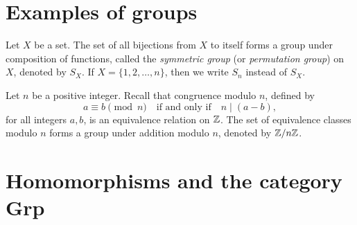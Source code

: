 \section{Examples of groups}

\begin{definition}
    Let \(X\) be a set. The set of all bijections from \(X\) to itself forms a group under composition of functions, called the \emph{symmetric group} (or \emph{permutation group}) on \(X\), denoted by \(S_X\). If \(X = \{1, 2, \ldots, n\}\), then we write \(S_n\) instead of \(S_X\).
\end{definition}


\begin{definition}
    \label{def:zmodn}
    Let \(n\) be a positive integer. Recall that congruence modulo \(n\), defined by
    \[
        a \equiv b \pmod{n} \quad \text{if and only if} \quad n \mid (a - b),
    \]
    for all integers \(a, b\), is an equivalence relation on \(\mathbb{Z}\). The set of equivalence classes modulo \(n\) forms a group under addition modulo \(n\), denoted by \(\mathbb{Z}/n\mathbb{Z}\).
\end{definition}

\section{Homomorphisms and the category {\normalfont\sffamily Grp}}

